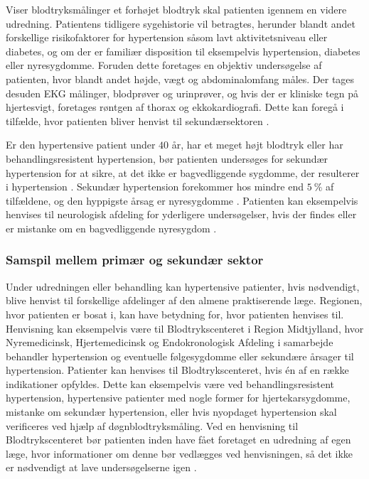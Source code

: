 Viser blodtryksmålinger et forhøjet blodtryk skal patienten igennem en videre udredning. Patientens tidligere sygehistorie vil betragtes, herunder blandt andet forskellige risikofaktorer for hypertension såsom lavt aktivitetsniveau eller diabetes, og om der er familiær disposition til eksempelvis hypertension, diabetes eller nyresygdomme. Foruden dette foretages en objektiv undersøgelse af patienten, hvor blandt andet højde, vægt og abdominalomfang måles. Der tages desuden EKG målinger, blodprøver og urinprøver, og hvis der er kliniske tegn på hjertesvigt, foretages røntgen af thorax og ekkokardiografi. Dette kan foregå i tilfælde, hvor patienten bliver henvist til sekundærsektoren \citep{lodberg2016, bech2015}.

Er den hypertensive patient under $40$ år, har et meget højt blodtryk eller har behandlingsresistent hypertension, bør patienten undersøges for sekundær hypertension for at sikre, at det ikke er bagvedliggende sygdomme, der resulterer i hypertension \citep{lodberg2016}. Sekundær hypertension forekommer hos mindre end $5~\%$ af tilfældene, og den hyppigste årsag er nyresygdomme \citep{lodberg2008}. Patienten kan eksempelvis henvises til neurologisk afdeling for yderligere undersøgelser, hvis der findes eller er mistanke om en bagvedliggende nyresygdom \citep{lodberg2016, sundhedsstyrelsen2010}. 

\subsubsection{Samspil mellem primær og sekundær sektor}
Under udredningen eller behandling kan hypertensive patienter, hvis nødvendigt, blive henvist til forskellige afdelinger af den almene praktiserende læge. Regionen, hvor patienten er bosat i, kan have betydning for, hvor patienten henvises til. Henvisning kan eksempelvis være til Blodtrykscenteret i Region Midtjylland, hvor Nyremedicinsk, Hjertemedicinsk og Endokronologisk Afdeling i samarbejde behandler hypertension og eventuelle følgesygdomme eller sekundære årsager til hypertension. Patienter kan henvises til Blodtrykscenteret, hvis én af en række indikationer opfyldes. Dette kan eksempelvis være ved behandlingsresistent hypertension, hypertensive patienter med nogle former for hjertekarsygdomme, mistanke om sekundær hypertension, eller hvis nyopdaget hypertension skal verificeres ved hjælp af døgnblodtryksmåling. Ved en henvisning til Blodtrykscenteret bør patienten inden have fået foretaget en udredning af egen læge, hvor informationer om denne bør vedlægges ved henvisningen, så det ikke er nødvendigt at lave undersøgelserne igen \citep{aarhusuniversitetshospital}. 

